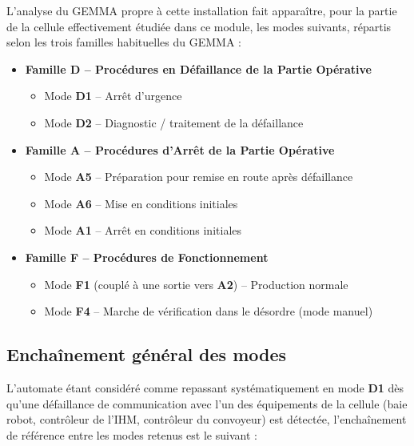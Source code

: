L'analyse du GEMMA propre à cette installation fait apparaître, pour
la partie de la cellule effectivement étudiée dans ce module, les modes
suivants, répartis selon les trois familles habituelles du GEMMA :

\begin{itemize}
    \item \textbf{Famille D -- Procédures en Défaillance de la Partie
    Opérative}
    \begin{itemize}
        \item Mode \textbf{D1} -- Arrêt d'urgence
        \item Mode \textbf{D2} -- Diagnostic / traitement de la défaillance
    \end{itemize}
    \item \textbf{Famille A -- Procédures d'Arrêt de la Partie Opérative}
    \begin{itemize}
        \item Mode \textbf{A5} -- Préparation pour remise en route après
        défaillance
        \item Mode \textbf{A6} -- Mise en conditions initiales
        \item Mode \textbf{A1} -- Arrêt en conditions initiales
    \end{itemize}
    \item \textbf{Famille F -- Procédures de Fonctionnement}
    \begin{itemize}
        \item Mode \textbf{F1} (couplé à une sortie vers \textbf{A2}) --
        Production normale
        \item Mode \textbf{F4} -- Marche de vérification dans le désordre
        (mode manuel)
    \end{itemize}
\end{itemize}

\subsection{Enchaînement général des modes}

L'automate étant considéré comme repassant systématiquement en mode
\textbf{D1} dès qu'une défaillance de communication avec l'un des
équipements de la cellule (baie robot, contrôleur de l'IHM, contrôleur du convoyeur) est
détectée, l'enchaînement de référence entre les modes retenus est le
suivant :

